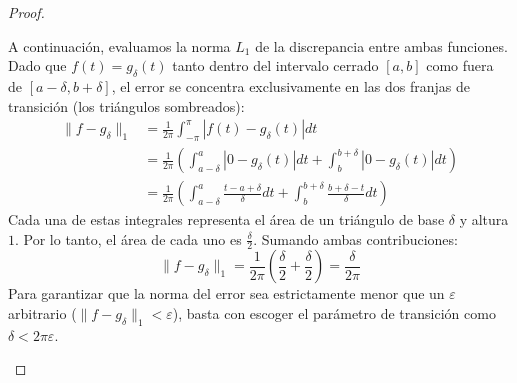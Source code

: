 \begin{proof}
\begin{itemize}
    A continuación, evaluamos la norma $L_1$ de la discrepancia entre ambas funciones. Dado que $f(t) = g_\delta(t)$ tanto dentro del intervalo cerrado $[a,b]$ como fuera de $[a-\delta, b+\delta]$, el error se concentra exclusivamente en las dos franjas de transición (los triángulos sombreados):
    \begin{align*}
        \|f - g_\delta\|_1 &= \frac{1}{2\pi} \int_{-\pi}^{\pi} |f(t) - g_\delta(t)| dt \\
        &= \frac{1}{2\pi} \left( \int_{a-\delta}^{a} |0 - g_\delta(t)| dt + \int_{b}^{b+\delta} |0 - g_\delta(t)| dt \right) \\
        &= \frac{1}{2\pi} \left( \int_{a-\delta}^{a} \frac{t - a + \delta}{\delta} dt + \int_{b}^{b+\delta} \frac{b + \delta - t}{\delta} dt \right)
    \end{align*}
    Cada una de estas integrales representa el área de un triángulo de base $\delta$ y altura $1$. Por lo tanto, el área de cada uno es $\frac{\delta}{2}$. Sumando ambas contribuciones:
    \begin{equation*}
        \|f - g_\delta\|_1 = \frac{1}{2\pi} \left( \frac{\delta}{2} + \frac{\delta}{2} \right) = \frac{\delta}{2\pi}
    \end{equation*}
    Para garantizar que la norma del error sea estrictamente menor que un $\varepsilon$ arbitrario ($\|f - g_\delta\|_1 < \varepsilon$), basta con escoger el parámetro de transición como $\delta < 2\pi\varepsilon$.
    
    \begin{center}
\end{center}
\end{itemize}
\end{proof}
